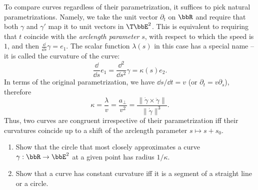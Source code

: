 \begin{example}
    To compare curves regardless of their parametrization, it suffices to pick natural parametrizations. Namely, we take the unit vector $\partial_t$ on $\bbR$ and require that both $\gamma$ and $\gamma'$ map it to unit vectors in $\T\bbE^2$. This is equivalent to requiring that $t$ coincide with the \emph{arclength parameter} $s$, with respect to which the speed is $1$, and then $\frac{\dd}{\dd s} \gamma=e_1$. The scalar function $\lambda(s)$ in this case has a special name -- it is called the curvature of the curve:
    \[\frac{\dd}{\dd s}e_1=\frac{\dd^2}{\dd s^2}\gamma=\kappa(s)e_2.\]
    In terms of the original parametrization, we have $\dd s/\dd t=v$ (or $\partial_t=v\partial_s$), therefore 
    \[\kappa=\frac{\lambda}{v}=\frac{a_{\perp}}{v^2}=\frac{\lVert\dot\gamma\times \ddot\gamma\rVert}{\lVert\dot\gamma\rVert^3}.\]
    Thus, two curves are congruent irrespective of their parametrization iff their curvatures coincide up to a shift of the arclength parameter $s\mapsto s+s_0$.
\end{example}

\begin{xca}
    \begin{enumerate}
        \item Show that the circle that most closely approximates a curve $\gamma:\bbR\to \bbE^2$ at a given point has radius $1/\kappa$.
        \item  Show that a curve has constant curvature iff it is a segment of a straight line or a circle.
    \end{enumerate}
\end{xca}

